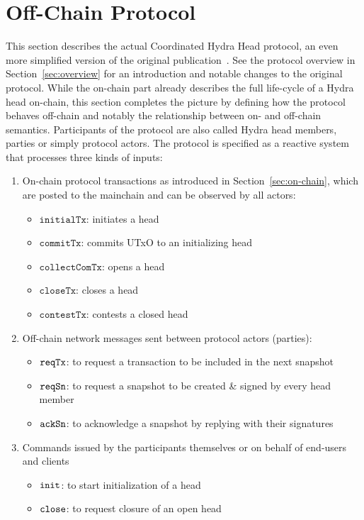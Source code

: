 \section{Off-Chain Protocol}\label{sec:offchain}

This section describes the actual Coordinated Hydra Head protocol, an even more
simplified version of the original publication~\cite{hydrahead20}. See the
protocol overview in Section~\ref{sec:overview} for an introduction and notable
changes to the original protocol. While the on-chain part already describes the
full life-cycle of a Hydra head on-chain, this section completes the picture by
defining how the protocol behaves off-chain and notably the relationship between
on- and off-chain semantics. Participants of the protocol are also called Hydra
head members, parties or simply protocol actors. The protocol is specified as a
reactive system that processes three kinds of inputs:
\begin{enumerate}
	\item On-chain protocol transactions as introduced in
	      Section~\ref{sec:on-chain}, which are posted to the mainchain and can be
	      observed by all actors:
				\begin{itemize}
					\item $\mathtt{initialTx}$: initiates a head
					\item $\mathtt{commitTx}$: commits UTxO to an initializing head
					\item $\mathtt{collectComTx}$: opens a head
					\item $\mathtt{closeTx}$: closes a head
					\item $\mathtt{contestTx}$: contests a closed head
				\end{itemize}
	\item Off-chain network messages sent between protocol actors (parties):
	      \begin{itemize}
		      \item $\mathtt{reqTx}$: to request a transaction to be included in the next snapshot
		      \item $\mathtt{reqSn}$: to request a snapshot to be created \& signed by every head member
		      \item $\mathtt{ackSn}$: to acknowledge a snapshot by replying with their signatures
	      \end{itemize}
	\item Commands issued by the participants themselves or on behalf of end-users and clients
	      \begin{itemize}
		      \item $\mathtt{init}$: to start initialization of a head
		      \item $\mathtt{close}$: to request closure of an open head
	      \end{itemize}
\end{enumerate}

